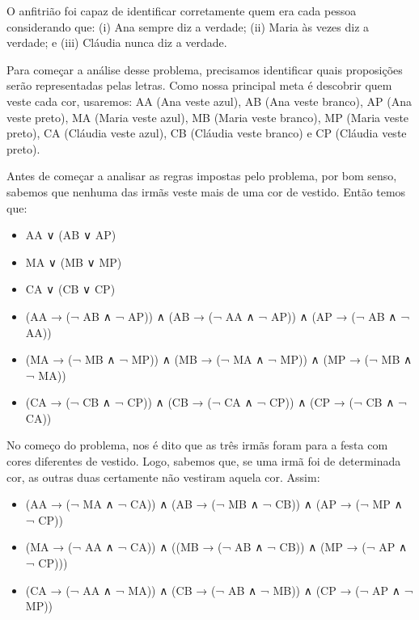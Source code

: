 O anfitrião foi capaz de identificar corretamente quem era cada pessoa considerando que: (i) Ana sempre diz a verdade; (ii) Maria às vezes diz a verdade; e (iii) Cláudia nunca diz a verdade.

Para começar a análise desse problema, precisamos identificar quais proposições serão representadas pelas letras. Como nossa principal meta é descobrir quem veste cada cor, usaremos: AA (Ana veste azul), AB (Ana veste branco), AP (Ana veste preto), MA (Maria veste azul), MB (Maria veste branco), MP (Maria veste preto), CA (Cláudia veste azul), CB (Cláudia veste branco) e CP (Cláudia veste preto).

Antes de começar a analisar as regras impostas pelo problema, por bom senso, sabemos que nenhuma das irmãs veste mais de uma cor de vestido. Então temos que:
\begin{itemize}
    \item AA ∨ (AB ∨ AP)
    \item  MA ∨ (MB ∨ MP)
    \item CA ∨ (CB ∨ CP)
    \item (AA → (¬ AB ∧ ¬ AP)) ∧ (AB → (¬ AA ∧ ¬ AP)) ∧ (AP → (¬ AB ∧ ¬ AA))
    \item (MA → (¬ MB ∧ ¬ MP)) ∧ (MB → (¬ MA ∧ ¬ MP)) ∧ (MP → (¬ MB ∧ ¬ MA))
    \item (CA → (¬ CB ∧ ¬ CP)) ∧ (CB → (¬ CA ∧ ¬ CP)) ∧ (CP → (¬ CB ∧ ¬ CA))
\end{itemize}

No começo do problema, nos é dito que as três irmãs foram para a festa com cores diferentes de vestido. Logo, sabemos que, se uma irmã foi de determinada cor, as outras duas certamente não vestiram aquela cor. Assim:

\begin{itemize}
    \item (AA → (¬ MA ∧ ¬ CA)) ∧ (AB → (¬ MB ∧ ¬ CB)) ∧ (AP → (¬ MP ∧ ¬ CP))
    \item (MA → (¬ AA ∧ ¬ CA)) ∧ ((MB → (¬ AB ∧ ¬ CB)) ∧ (MP → (¬ AP ∧ ¬ CP)))
    \item (CA → (¬ AA ∧ ¬ MA)) ∧ (CB → (¬ AB ∧ ¬ MB)) ∧ (CP → (¬ AP ∧ ¬ MP))
\end{itemize}

